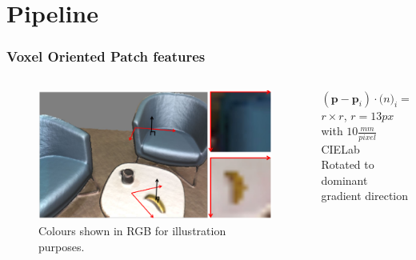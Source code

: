 \documentclass[mathserif, 10pt]{beamer}
\begin{document}
\section{Pipeline}
\begin{frame}
\frametitle{Voxel Oriented Patch features}

\begin{columns}
 \begin{column}{0.5\textwidth}
  \begin{figure}
  \center
  \includegraphics[width=\textwidth]{figures/vop}
  \caption{Colours shown in RGB for illustration purposes.}
  \label{fig:vop}
\end{figure}
 \end{column}
 \begin{column}{0.5\textwidth}
    $(\mathbf{p} - \mathbf{p}_i) \cdot \mathbf(n)_i = 0$ \\
    $r \times r$, $r = 13px$ with $10\frac{mm}{pixel}$\\
    CIELab\\
    Rotated to dominant gradient direction

  
 \end{column}

\end{columns}
\end{frame}
\end{document}
